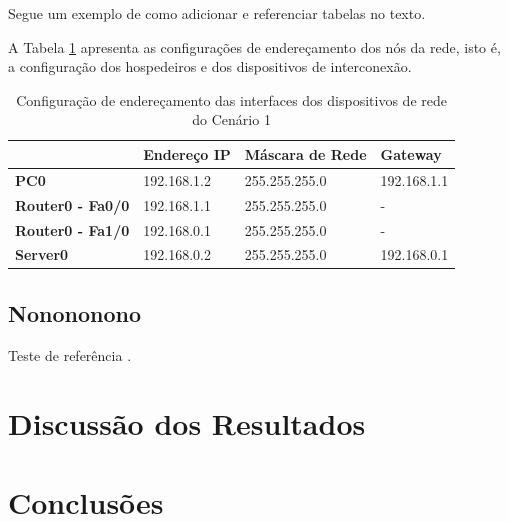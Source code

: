 \documentclass[
	12pt,				%
	oneside,   	        %
	a4paper,			%
	english,			%
	french,				%
	spanish,			%
	brazil,				%
	]{pacotes/abntex2}
\begin{document}
Segue um exemplo de como adicionar e referenciar tabelas no texto.

A Tabela \ref{tab:cenarioenderecos} apresenta as configurações de endereçamento dos nós da rede, isto é, a configuração dos hospedeiros e dos dispositivos de interconexão.

\begin{table}[!htb]
\centering
\caption{Configuração de endereçamento das interfaces dos dispositivos de rede do Cenário 1}
\label{tab:cenarioenderecos}
\footnotesize   %
\begin{tabular}{l|lll}
\toprule
& \textbf{Endereço IP} & \textbf{Máscara de Rede} & \textbf{Gateway}\\ 
\midrule
\textbf{PC0} & 192.168.1.2 & 255.255.255.0 & 192.168.1.1 \\
\textbf{Router0 - Fa0/0} & 192.168.1.1 & 255.255.255.0 & - \\
\textbf{Router0 - Fa1/0} & 192.168.0.1 & 255.255.255.0 & - \\
\textbf{Server0} & 192.168.0.2 & 255.255.255.0 & 192.168.0.1 \\
 \bottomrule
\end{tabular}
\end{table}

\subsection{Nonononono}
 Teste de referência \cite{talbot2012}.
 
\section{Discussão dos Resultados}
\label{sec:discussao}

\section{Conclusões}
\label{sec:conclusoes}

\postextual
\renewcommand{\bibsection}{%
\section{\bibname}
\bibmark
\prebibhook}
\end{document}
